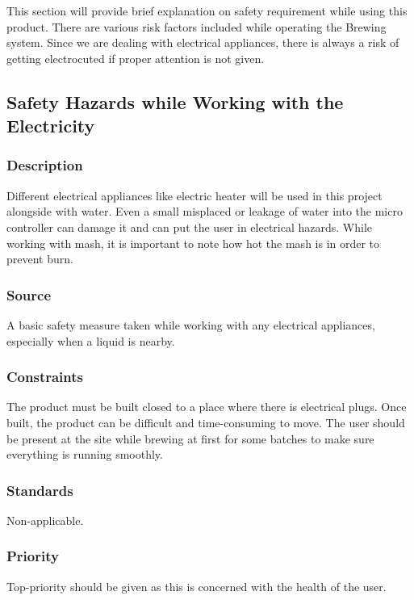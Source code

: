 This section will provide brief explanation on safety requirement while using this product. There are various risk factors included while operating the Brewing system. Since we are dealing with electrical appliances, there is always a risk of getting electrocuted if proper attention is not given. 

\subsection{Safety Hazards while Working with the Electricity}
\subsubsection{Description}
Different electrical appliances like electric heater will be used in this project alongside with water. Even a small misplaced or leakage of water into the micro controller can damage it and can put the user in electrical hazards. While working with mash, it is important to note how hot the mash is in order to prevent burn.

\subsubsection{Source}
A basic safety measure taken while working with any electrical appliances, especially when a liquid is nearby.

\subsubsection{Constraints}
The product must be built closed to a place where there is electrical plugs. Once built, the product can be difficult and time-consuming to move. The user should be present at the site while brewing at first for some batches to make sure everything is running smoothly.

\subsubsection{Standards}
Non-applicable.

\subsubsection{Priority}
Top-priority should be given as this is concerned with the health of the user.